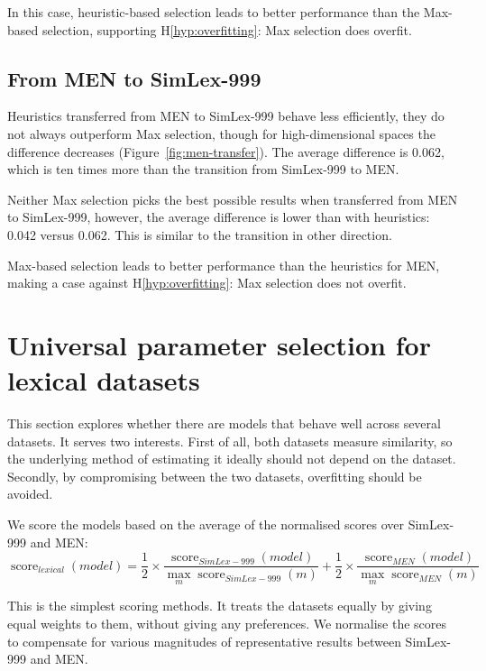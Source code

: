In this case, heuristic-based selection leads to better performance than the Max-based selection, supporting H\ref{hyp:overfitting}: Max selection does overfit.

\subsection{From MEN to SimLex-999}

Heuristics transferred from MEN to SimLex-999 behave less efficiently, they do not always outperform Max selection, though for high-dimensional spaces the difference decreases (Figure~\ref{fig:men-transfer}). The average difference is 0.062, which is ten times more than the transition from SimLex-999 to MEN.

Neither Max selection picks the best possible results when transferred from MEN to SimLex-999, however, the average difference is lower than with heuristics: 0.042 versus 0.062. This is similar to the transition in other direction.

Max-based selection leads to better performance than the heuristics for MEN, making a case against H\ref{hyp:overfitting}: Max selection does not overfit.

\section{Universal parameter selection for lexical datasets}
\label{sec:universal-lexical-param-selection}



This section explores whether there are models that behave well across several datasets. It serves two interests. First of all, both datasets measure similarity, so the underlying method of estimating it ideally should not depend on the dataset. Secondly, by compromising between the two datasets, overfitting should be avoided.

We score the models based on the average of the normalised scores over SimLex-999 and MEN:
\begin{equation}
\operatorname{score}_\mathit{lexical}(\mathit{model}) =%
\frac{1}{2}\times%
\frac{\operatorname{score}_\mathit{SimLex-999}(\mathit{model})}%
{\max_m\operatorname{score}_\mathit{SimLex-999}(m)}%
+%
\frac{1}{2}\times%
\frac{\operatorname{score}_\mathit{MEN}(\mathit{model})}%
{\max_m\operatorname{score}_\mathit{MEN}(m)}%
\end{equation}

This is the simplest scoring methods. It treats the datasets equally by giving equal weights to them, without giving any preferences. We normalise the scores to compensate for various magnitudes of representative results between SimLex-999 and MEN.

